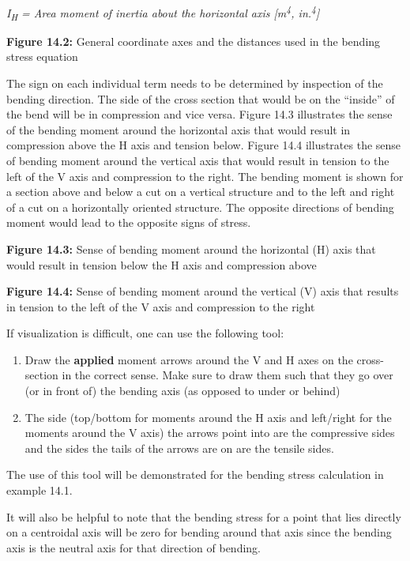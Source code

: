 \documentclass[
  letterpaper,
  DIV=11,
  numbers=noendperiod]{scrreprt}
\providecommand{\tightlist}{%
  \setlength{\itemsep}{0pt}\setlength{\parskip}{0pt}}\usepackage{longtable,booktabs,array}
\theoremstyle{definition}
\theoremstyle{remark}
\begin{document}
\emph{I\textsubscript{H} = Area moment of inertia about the horizontal
axis {[}m\textsuperscript{4}, in.\textsuperscript{4}{]}}

\textbf{Figure 14.2:} General coordinate axes and the distances used in
the bending stress equation

The sign on each individual term needs to be determined by inspection of
the bending direction. The side of the cross section that would be on
the ``inside'' of the bend will be in compression and vice versa. Figure
14.3 illustrates the sense of the bending moment around the horizontal
axis that would result in compression above the H axis and tension
below. Figure 14.4 illustrates the sense of bending moment around the
vertical axis that would result in tension to the left of the V axis and
compression to the right. The bending moment is shown for a section
above and below a cut on a vertical structure and to the left and right
of a cut on a horizontally oriented structure. The opposite directions
of bending moment would lead to the opposite signs of stress.

\textbf{Figure 14.3:} Sense of bending moment around the horizontal (H)
axis that would result in tension below the H axis and compression above

\textbf{Figure 14.4:} Sense of bending moment around the vertical (V)
axis that results in tension to the left of the V axis and compression
to the right

If visualization is difficult, one can use the following tool:

\begin{enumerate}
\def\labelenumi{\arabic{enumi}.}
\tightlist
\item
  Draw the \textbf{applied} moment arrows around the V and H axes on the
  cross-section in the correct sense. Make sure to draw them such that
  they go over (or in front of) the bending axis (as opposed to under or
  behind)
\item
  The side (top/bottom for moments around the H axis and left/right for
  the moments around the V axis) the arrows point into are the
  compressive sides and the sides the tails of the arrows are on are the
  tensile sides.
\end{enumerate}

The use of this tool will be demonstrated for the bending stress
calculation in example 14.1.

It will also be helpful to note that the bending stress for a point that
lies directly on a centroidal axis will be zero for bending around that
axis since the bending axis is the neutral axis for that direction of
bending.
\end{document}
